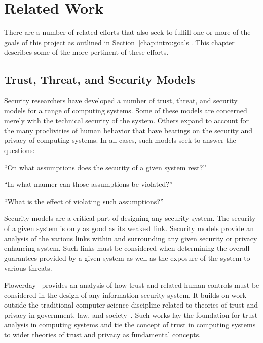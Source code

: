 \chapter{Related Work}
\label{chap:related}

There are a number of related efforts that also seek to fulfill one or
more of the goals of this project as outlined in
Section~\ref{chap:intro:goals}. This chapter describes some of the
more pertinent of these efforts.

\section{Trust, Threat, and Security Models}
\label{chap:related:models}

Security researchers have developed a number of trust, threat, and
security models for a range of computing systems. Some of these models
are concerned merely with the technical security of the system. Others
expand to account for the many proclivities of human behavior that
have bearings on the security and privacy of computing systems. In all
cases, such models seek to answer the questions:

\begin{packed_item}
\item ``On what assumptions does the security of a given system rest?''
\item ``In what manner can those assumptions be violated?''
\item ``What is the effect of violating such assumptions?''
\end{packed_item}

Security models are a critical part of designing any security
system. The security of a given system is only as good as its weakest
link. Security models provide an analysis of the various links within
and surrounding any given security or privacy enhancing system.  Such
links must be considered when determining the overall guarantees
provided by a given system as well as the exposure of the system to
various threats.

Flowerday~\cite{flowerday2006} provides an analysis of how trust and
related human controls must be considered in the design of any
information security system. It builds on work outside the traditional
computer science discipline related to theories of trust and privacy
in government, law, and society~\cite{camp2003}. Such works lay the
foundation for trust analysis in computing systems and tie the concept
of trust in computing systems to wider theories of trust and privacy
as fundamental concepts.

